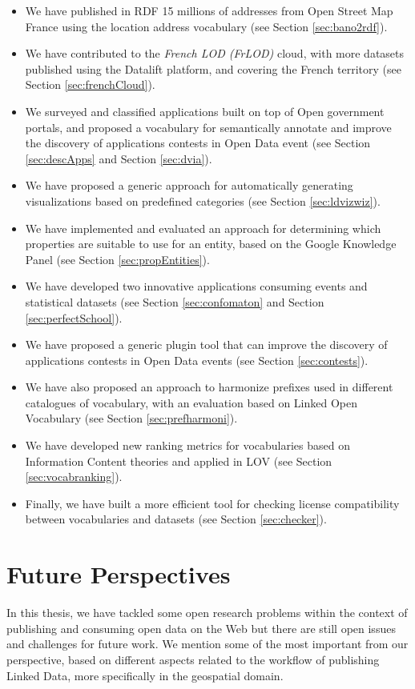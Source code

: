 \begin{itemize}
\item We have published in RDF 15 millions of addresses from Open Street Map France using the location address vocabulary (see Section \ref{sec:bano2rdf}).
\item We have contributed to the \textit{French LOD (FrLOD)} cloud, with more datasets published using the Datalift platform, and covering the French territory (see Section \ref{sec:frenchCloud}).
\item We surveyed and classified applications built on top of Open government portals, and proposed a vocabulary for semantically annotate and improve the discovery of applications contests in Open Data event (see Section \ref{sec:descApps} and Section \ref{sec:dvia}).
\item We have proposed a generic approach for automatically generating visualizations based on predefined categories (see Section \ref{sec:ldvizwiz}).
\item We have implemented and evaluated an approach for determining which properties are suitable to use for an entity, based on the Google Knowledge Panel (see Section \ref{sec:propEntities}).
\item We have developed two innovative applications consuming events and statistical datasets (see Section \ref{sec:confomaton} and Section \ref{sec:perfectSchool}).
\item We have proposed a generic plugin tool that can improve the discovery of applications contests in Open Data events (see Section \ref{sec:contests}).
\item We have also proposed an approach to harmonize prefixes used in different catalogues of vocabulary, with an evaluation based on Linked Open Vocabulary (see Section \ref{sec:prefharmoni}).
\item We have developed new ranking metrics for vocabularies based on Information Content theories and applied in LOV (see Section \ref{sec:vocabranking}).

\item Finally, we have built a more efficient tool for checking license compatibility between vocabularies and datasets (see Section \ref{sec:checker}).
\end{itemize}


\section{Future Perspectives}
\label{sec:future}

In this thesis, we have tackled some open research problems within the context of publishing and consuming open data on the Web but there are still open issues and challenges for future work. We  mention some of the most important from our perspective, based on different aspects related to the workflow of publishing Linked Data, more specifically in the geospatial domain. 

